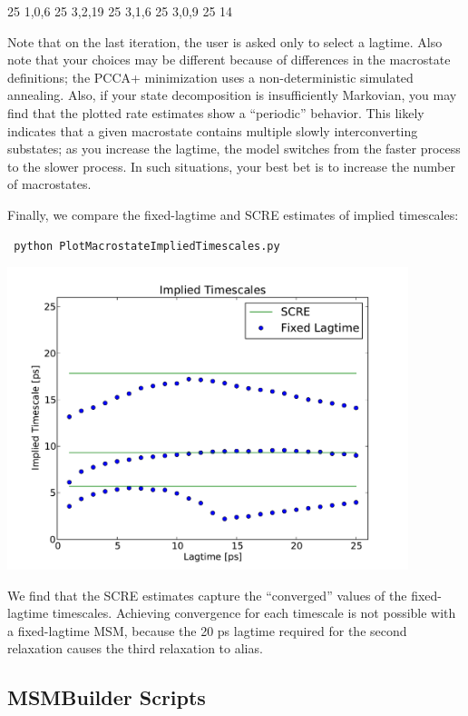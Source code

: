 \documentclass[12pt]{article}
\begin{document}
25
1,0,6
25
3,2,19
25
3,1,6
25
3,0,9
25
14

Note that on the last iteration, the user is asked only to select a lagtime.  Also note that your choices may be different because of differences in the macrostate definitions; the PCCA+ minimization uses a non-deterministic simulated annealing.  Also, if your state decomposition is insufficiently Markovian, you may find that the plotted rate estimates show a ``periodic'' behavior.  This likely indicates that a given macrostate contains multiple slowly interconverting substates; as you increase the lagtime, the model switches from the faster process to the slower process.  In such situations, your best bet is to increase the number of macrostates.  

Finally, we compare the fixed-lagtime and SCRE estimates of implied timescales:

\begin{verbatim}
 python PlotMacrostateImpliedTimescales.py
\end{verbatim}


\includegraphics[width=11.7cm]{figures/SCRE}


We find that the SCRE estimates capture the ``converged'' values of the fixed-lagtime timescales.  Achieving convergence for each timescale is not possible with a fixed-lagtime MSM, because the 20 ps lagtime required for the second relaxation causes the third relaxation to alias.  

\newpage

\subsection{MSMBuilder Scripts}
\end{document}
